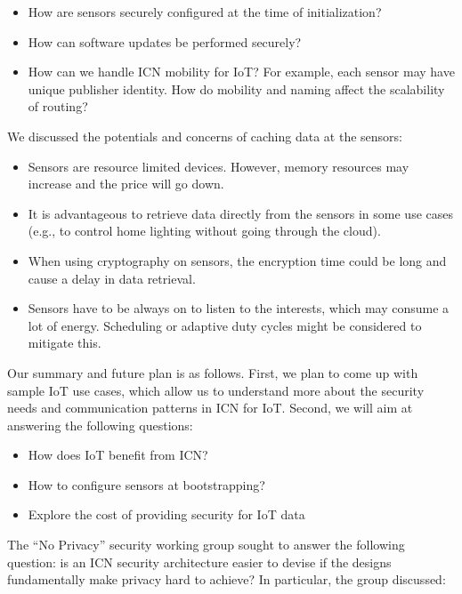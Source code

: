 \documentclass[a4paper,UKenglish]{dagrep}
\begin{document}
\begin{itemize}
\item How are sensors securely configured at the time of initialization?
\item How can software updates be performed securely?
\item How can we handle ICN mobility for IoT? For example, each sensor may have unique publisher identity. How do mobility and naming affect the scalability of routing?
\end{itemize}

We discussed the potentials and concerns of caching data at the sensors:

\begin{itemize}
\item Sensors are resource limited devices. However, memory resources may increase and the price will go down.
\item It is advantageous to retrieve data directly from the sensors in some use cases (e.g., to control home lighting without going through the cloud).
\item When using cryptography on sensors, the encryption time could be long and cause a delay in data retrieval.
\item Sensors have to be always on to listen to the interests, which may consume a lot of energy. Scheduling or adaptive duty cycles might be considered to mitigate this.
\end{itemize}
 
Our summary and future plan is as follows. First, we plan to come up with sample IoT use cases, which allow us to understand more about the security needs and communication patterns in ICN for IoT. Second, we will aim at answering the following questions:

\begin{itemize}
\item How does IoT benefit from ICN?
\item How to configure sensors at bootstrapping?
\item Explore the cost of providing security for IoT data
\end{itemize}

\license

The ``No Privacy'' security working group sought to answer the following question: is an ICN security architecture easier to devise if the designs fundamentally make privacy hard to achieve? In particular, the group discussed:
\end{document}
